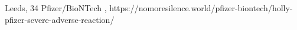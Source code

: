           {Leeds, }
          {34}
          {Pfizer/BioNTech}
          {}
          {
            ,
          }
          {https://nomoresilence.world/pfizer-biontech/holly-pfizer-severe-adverse-reaction/}

